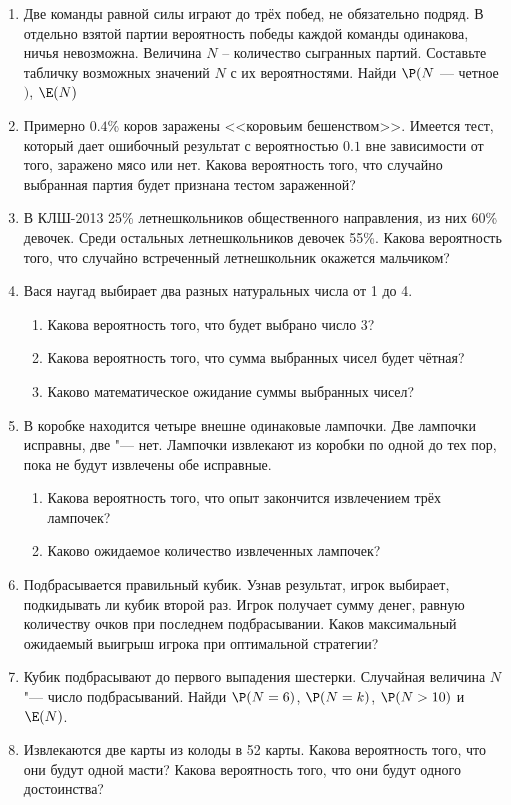 \documentclass[pdftex,12pt,a4paper]{article}
\begin{document}
\begin{enumerate}[resume]
\item Две команды равной силы играют до трёх побед, не обязательно подряд. В отдельно взятой партии вероятность победы каждой команды одинакова, ничья невозможна.  Величина $N$ -- количество сыгранных партий. Составьте табличку возможных значений $N$ с их вероятностями. Найди $\P(N$ --- четное$)$, $\E(N)$ 

\item Примерно $0.4$\% коров заражены <<коровьим бешенством>>.  Имеется тест, который дает ошибочный результат с вероятностью $0.1$ вне зависимости от того, заражено мясо или нет. Какова вероятность того, что случайно выбранная партия будет признана тестом зараженной?

\item В КЛШ-2013 25\% летнешкольников общественного направления, из них 60\% девочек. Среди остальных летнешкольников девочек 55\%. Какова вероятность того, что случайно встреченный летнешкольник окажется мальчиком?

\item Вася наугад выбирает два разных натуральных числа от 1 до 4.
\begin{enumerate}
\item Какова вероятность того, что будет выбрано число 3?
\item Какова вероятность того, что сумма выбранных чисел будет чётная?
\item Каково математическое ожидание суммы выбранных чисел?
\end{enumerate}

\item  В коробке находится четыре внешне одинаковые лампочки. Две
лампочки исправны, две "--- нет. Лампочки извлекают из коробки по
одной до тех пор, пока не будут извлечены обе исправные.
\begin{enumerate}
\item Какова вероятность того, что опыт закончится извлечением трёх
лампочек?
\item  Каково ожидаемое количество извлеченных лампочек?
\end{enumerate}

\item Подбрасывается правильный кубик. Узнав результат, игрок выбирает,
подкидывать ли кубик второй раз. Игрок получает сумму денег, равную
количеству очков при последнем подбрасывании. Каков максимальный ожидаемый выигрыш игрока при оптимальной стратегии?

\item Кубик подбрасывают до первого выпадения шестерки. Случайная величина  $N$ "---
число подбрасываний. Найди $\P(N=6)$, $\P(N=k)$, $\P(N>10)$ и  $\E(N)$.

\item Извлекаются две карты из колоды в 52 карты. Какова вероятность того, что они будут одной масти? Какова вероятность того, что они будут одного достоинства?


\end{enumerate}
\end{document}
